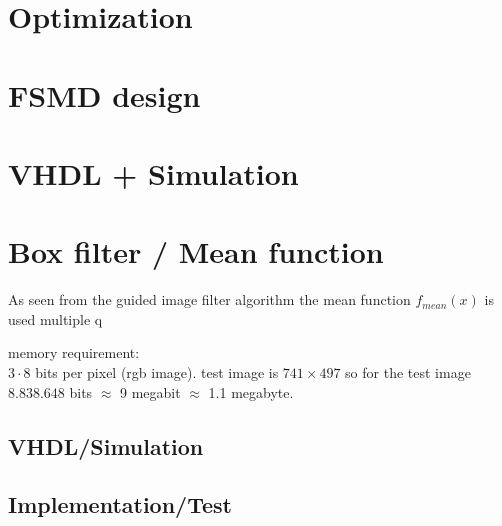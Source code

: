 \section{Optimization}

\section{FSMD design}

\section{VHDL + Simulation}

\section*{Box filter / Mean function}
As seen from the guided image filter algorithm the mean function $f_{mean}(x)$ is used multiple q

%

memory requirement: \\
$3 \cdot 8$ bits per pixel (rgb image). test image is $741 \times 497$ so for the test image $8.838.648$ bits $\approx$ 9 megabit $\approx$ 1.1 megabyte.

\subsection*{VHDL/Simulation}

\subsection*{Implementation/Test}

